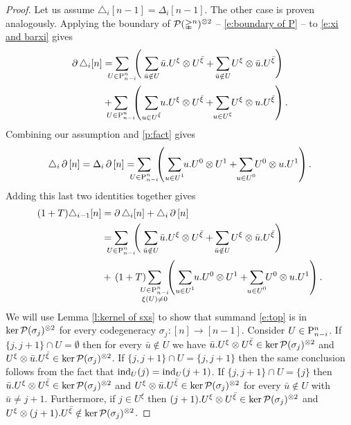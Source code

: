 \begin{proof}
	Let us assume $\triangle_i [n-1] = \Delta_i [n-1]$.
	The other case is proven analogously.
	Applying the boundary of $\cP(\simplex^n)^{\ot 2}$ -- \cref{e:boundary of P} -- to \cref{e:xi and barxi} gives
	\begin{align*}
	\bd \triangle_i [n] & =
	\sum_{\mathclap{U \in \P_{n-i}^n}} \
	\left(\
	\sum_{\mathclap{\bar u \notin U}} \bar u.U^\xi \ot U^\barxi +
	\sum_{\mathclap{\bar u \notin U}} U^\xi \ot \bar u.U^\barxi
	\right) \\ & +
	\sum_{\mathclap{U \in \P_{n-i}^n}} \
	\left(\
	\sum_{\mathclap{u \in U^\barxi}} u.U^\xi \ot U^\barxi +
	\sum_{\mathclap{u \in U^{\xi}}} U^\xi \ot u.U^\barxi
	\right).
	\end{align*}
	Combining our assumption and \cref{p:fact} gives
	\[
	\triangle_i \bd \, [n] =
	\Delta_i \bd \, [n] =
	\sum_{\mathclap{U \in \P_{n-i}^n}} \
	\left(\
	\sum_{\mathclap{u \in U^1}} u.U^0 \ot U^1 +
	\sum_{\mathclap{u \in U^0}} U^0 \ot u.U^1
	\right).
	\]
	Adding this last two identities together gives
	\begin{align}
	(1+T) \triangle_{i-1} [n] &=
	\bd \triangle_i [n] + \triangle_i \bd \, [n] \\ &=
	\label{e:top} \sum_{\mathclap{U \in \P_{n-i}^n}} \
	\left(\
	\sum_{\mathclap{\bar u \notin U}} \bar u.U^\xi \ot U^\barxi +
	\sum_{\mathclap{\bar u \notin U}} U^\xi \ot \bar u.U^\barxi
	\right) \\ &+ \,
	\label{e:bottom} (1+T) \sum_{\mathclap{\substack{U \in \P_{n-i}^n \\ \xi(U) \neq 0}}} \
	\left(\
	\sum_{\mathclap{u \in U^1}} u.U^0 \ot U^1 +
	\sum_{\mathclap{u \in U^0}} U^0 \ot u.U^1
	\right).
	\end{align}
	We will use Lemma \ref{l:kernel of sxs} to show that summand \eqref{e:top} is in $\ker \cP(\sigma_j)^{\ot 2}$ for every codegeneracy $\sigma_j \colon [n] \to [n-1]$.
	Consider $U \in \P_{n-i}^n$.
	If $\{j, j+1\} \cap U = \emptyset$ then for every $\bar u \notin U$ we have $\bar u.U^\xi \ot U^\barxi \in \ker \cP(\sigma_j)^{\ot 2}$ and $U^\xi \ot \bar u.U^\barxi \in \ker \cP(\sigma_j)^{\ot 2}$.
	If $\{j, j+1\} \cap U = \{j, j+1\}$ then the same conclusion follows from the fact that $\ind_U(j) = \ind_U(j+1)$.
	If $\{j, j+1\} \cap U = \{j\}$ then $\bar u.U^\xi \ot U^\barxi \in \ker \cP(\sigma_j)^{\ot 2}$ and $U^\xi \ot \bar u.U^\barxi \in \ker \cP(\sigma_j)^{\ot 2}$ for every $\bar u \notin U$ with $\bar u \neq j+1$.
	Furthermore, if $j \in U^\xi$ then $(j+1).U^\xi \ot U^\barxi \in \ker \cP(\sigma_j)^{\ot 2}$ and $U^\xi \ot (j+1).U^\barxi \notin \ker \cP(\sigma_j)^{\ot 2}$.

\end{proof}
